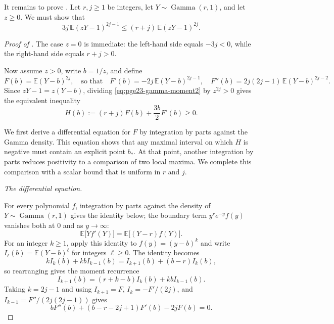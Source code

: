 \documentclass[11pt]{article}
\theoremstyle{remark}
\numberwithin{equation}{section}
\newcommand{\E}{\mathbb E}
\newcommand{\GammaLaw}{\operatorname{Gamma}}
\begin{document}
It remains to prove . Let $r,j\ge1$ be
integers, let $Y\sim\GammaLaw(r,1)$, and let $z\ge0$. We must show that
\begin{equation}
  3j\,\E(zY-1)^{2j-1}
  \le(r+j)\,\E(zY-1)^{2j}. \label{eq:pge23-gamma-moment2}
\end{equation}

\begin{proof}[Proof of ]
  The case $z=0$ is immediate: the left-hand side equals $-3j<0$, while
  the right-hand side equals $r+j>0$.

  Now assume $z>0$, write $b=1/z$, and define
  \[
    F(b)=\E(Y-b)^{2j},
    \quad\text{so that}\quad
    F'(b)=-2j\,\E(Y-b)^{2j-1},
    \quad
    F''(b)=2j(2j-1)\,\E(Y-b)^{2j-2}.
  \]
  Since $zY-1=z(Y-b)$, dividing \eqref{eq:pge23-gamma-moment2} by
  $z^{2j}>0$ gives the equivalent inequality
  \begin{equation}\label{eq:pge23-gamma-H}
    H(b):=(r+j)F(b)+\frac{3b}{2}F'(b)\ge0.
  \end{equation}

  We first derive a differential equation for $F$ by integration by
  parts against the Gamma density. This equation shows that any maximal interval
  on which $H$ is negative must contain an explicit point $b_*$.
  At that point, another integration by parts reduces positivity to a
  comparison of two local maxima. We complete this comparison with a
  scalar bound that is uniform in $r$ and $j$.

  \smallskip
  \noindent\emph{The differential equation.}

  For every polynomial $f$, integration by parts against the density of
  $Y\sim\GammaLaw(r,1)$ gives the identity below; the boundary term
  $y^re^{-y}f(y)$ vanishes both at $0$ and as $y\to\infty$:
  \begin{equation*}
    \E\bigl[Yf'(Y)\bigr]=\E\bigl[(Y-r)f(Y)\bigr].
  \end{equation*}
  For an integer $k\ge1$, apply this identity to $f(y)=(y-b)^k$
  and write $I_\ell(b)=\E(Y-b)^\ell$ for integers $\ell\ge0$.
  The identity becomes
  \[
    kI_k(b)+kbI_{k-1}(b)=I_{k+1}(b)+(b-r)I_k(b),
  \]
  so rearranging gives the moment recurrence
  \begin{equation*}
    I_{k+1}(b)=(r+k-b)I_k(b)+kbI_{k-1}(b).
  \end{equation*}
  Taking $k=2j-1$ and using $I_{k+1}=F$,
  $I_k=-F'/(2j)$, and $I_{k-1}=F''/(2j(2j-1))$ gives
  \begin{equation}\label{eq:pge23-gamma-ODE}
    bF''(b)+(b-r-2j+1)F'(b)-2jF(b)=0.
  \end{equation}


\end{proof}
\end{document}
